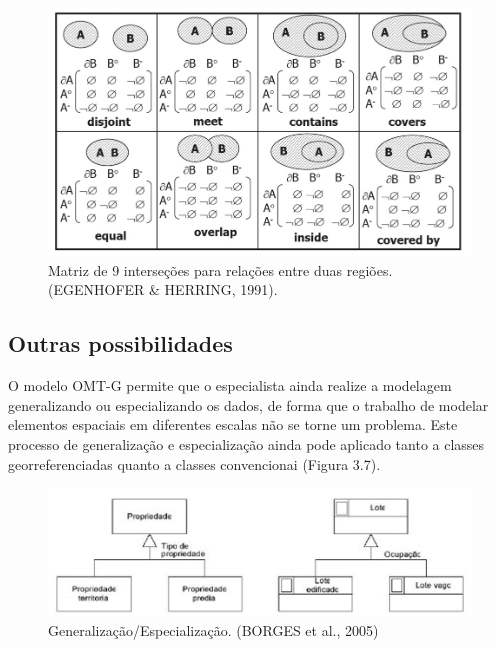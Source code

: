 		\begin{figure} [h]
			\centering
			\includegraphics[width=1\linewidth]{data/relac_topologicos}
			\caption{Matriz de 9 interseções para relações entre duas regiões. (EGENHOFER \& HERRING, 1991).}
			\label{fig:relactopologicos}
		\end{figure}
		
		\subsection{Outras possibilidades}
		
		O modelo OMT-G permite que o especialista ainda realize a modelagem generalizando ou especializando os dados, de forma que o trabalho de modelar elementos espaciais em diferentes escalas não se torne um problema. Este processo de generalização e especialização ainda pode aplicado tanto a classes georreferenciadas quanto a classes convencionai (Figura 3.7). 
		
		\begin{figure} [h]
			\centering
			\includegraphics[width=1\linewidth]{data/generalizacao_especializacao}
			\caption{Generalização/Especialização. (BORGES et al., 2005)}
			\label{fig:generalizacaoespecializacao}
		\end{figure}
		
